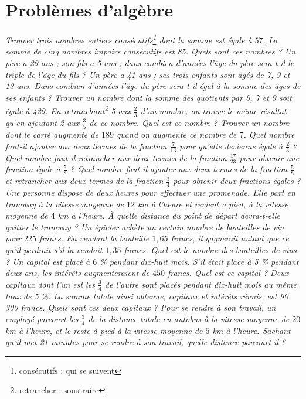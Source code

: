 
 \chapter{Problèmes d'algèbre}
 
 \begin{itemize}
 \it Trouver trois nombres entiers consécutifs\footnote{consécutifs : qui se suivent} dont la somme est égale à $57$. 
 \it La somme de cinq nombres impairs consécutifs est 85. Quels sont ces nombres ? 
 \it Un père a 29 ans ; son fils a 5 ans ; dans combien d'années l'âge du père sera-t-il le triple de l'âge du fils ? 
 \it Un père a 41 ans ; ses trois enfants sont âgés de 7, 9 et 13 ans. Dans combien d'années l'âge du père sera-t-il égal à la somme des âges de ses enfants ? 
 \it Trouver un nombre dont la somme des quotients par 5, 7 et 9 soit égale à 429. 
 \it En retranchant\footnote{retrancher : soustraire} 5 aux $\frac23$ d'un nombre, on trouve le même résultat qu'en ajoutant 2 aux $\frac35$ de ce nombre. Quel est ce nombre ? 
 \it Trouver un nombre dont le carré augmente de $189$ quand on augmente ce nombre de $7$. 
 \it Quel nombre faut-il ajouter aux deux termes de la fraction $\frac7{13}$ pour qu'elle devienne égale à $\frac23$ ? 
 \it Quel nombre faut-il retrancher aux deux termes de la fraction $\frac{17}{23}$ pour obtenir une fraction égale à $\frac58$ ? 
 \it Quel nombre faut-il ajouter aux deux termes de la fraction $\frac58$ et retrancher aux deux termes de la fraction $\frac34$ pour obtenir deux fractions égales ? 
 \it Une personne dispose de deux heures pour effectuer une promenade. Elle part en tramway à la vitesse moyenne de $12$ km à l'heure et revient à pied, à la vitesse moyenne de $4$ km à l'heure. À quelle distance du point de départ devra-t-elle quitter le tramway ? 
 \it Un épicier achète un certain nombre de bouteilles de vin pour $225$ francs. En vendant la bouteille $1,65$ francs, il gagnerait autant que ce qu'il perdrait s'il la vendait $1,35$ francs. Quel est le nombre des bouteilles de vins ? 
 \it Un capital est placé à $6$ \% pendant dix-huit mois. S'il était placé à 5 \% pendant deux ans, les intérêts augmenteraient de $450$ francs. Quel est ce capital ? 
 \it Deux capitaux dont l'un est les $\frac34$ de l'autre sont placés pendant dix-huit mois au même taux de 5 \%. La somme totale ainsi obtenue, capitaux et intérêts réunis, est 90 300 francs. Quels sont ces deux capitaux ? 
 \it Pour se rendre à son travail, un employé parcourt les $\frac34$ de la distance totale en autobus à la vitesse moyenne de $20$ km à l'heure, et le reste à pied à la vitesse moyenne de $5$ km à l'heure. Sachant qu'il met 21 minutes pour se rendre à son travail, quelle distance parcourt-il ? 

\end{itemize}
